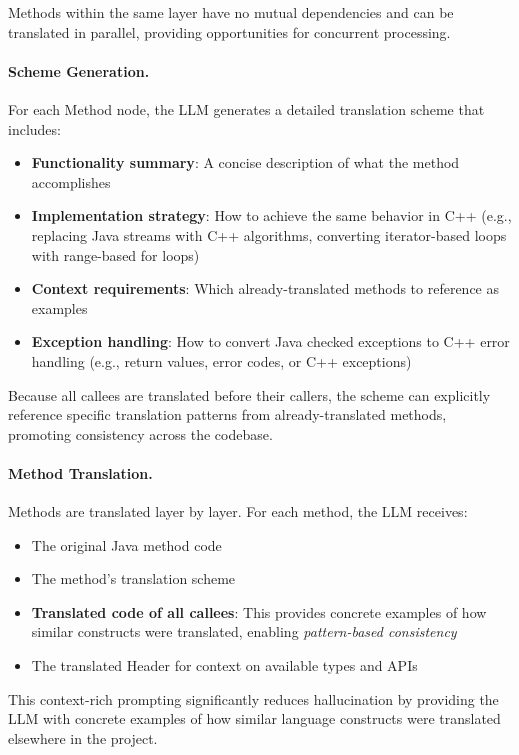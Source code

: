 Methods within the same layer have no mutual dependencies and can be translated in parallel, providing opportunities for concurrent processing.

\paragraph{Scheme Generation.} For each Method node, the LLM generates a detailed translation scheme that includes:
\begin{itemize}
\item \textbf{Functionality summary}: A concise description of what the method accomplishes
\item \textbf{Implementation strategy}: How to achieve the same behavior in C++ (e.g., replacing Java streams with C++ algorithms, converting iterator-based loops with range-based for loops)
\item \textbf{Context requirements}: Which already-translated methods to reference as examples
\item \textbf{Exception handling}: How to convert Java checked exceptions to C++ error handling (e.g., return values, error codes, or C++ exceptions)
\end{itemize}

Because all callees are translated before their callers, the scheme can explicitly reference specific translation patterns from already-translated methods, promoting consistency across the codebase.

\paragraph{Method Translation.} Methods are translated layer by layer. For each method, the LLM receives:
\begin{itemize}
\item The original Java method code
\item The method's translation scheme
\item \textbf{Translated code of all callees}: This provides concrete examples of how similar constructs were translated, enabling \emph{pattern-based consistency}
\item The translated Header for context on available types and APIs
\end{itemize}

This context-rich prompting significantly reduces hallucination by providing the LLM with concrete examples of how similar language constructs were translated elsewhere in the project.

